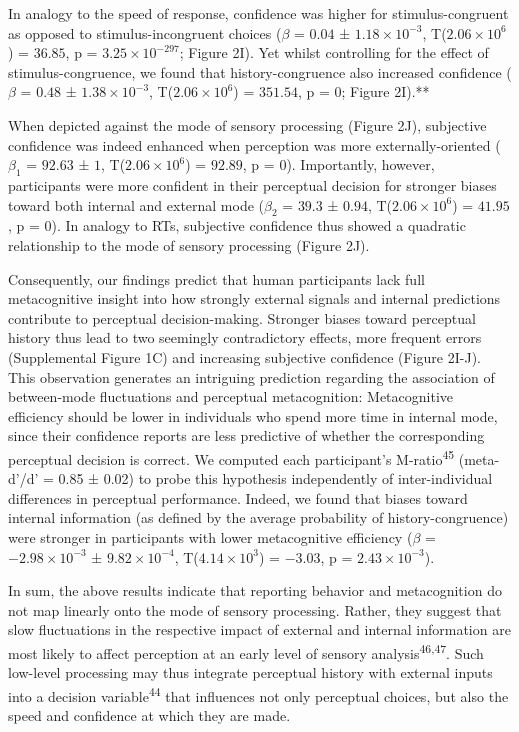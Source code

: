 \documentclass[
]{article}
\begin{document}
In analogy to the speed of response, confidence was higher for
stimulus-congruent as opposed to stimulus-incongruent choices (\(\beta\)
= \(0.04\) ± \(\ensuremath{1.18\times 10^{-3}}\),
T(\(\ensuremath{2.06\times 10^{6}}\)) = \(36.85\), p =
\(\ensuremath{3.25\times 10^{-297}}\); Figure 2I). Yet whilst
controlling for the effect of stimulus-congruence, we found that
history-congruence also increased confidence (\(\beta\) = \(0.48\) ±
\(\ensuremath{1.38\times 10^{-3}}\),
T(\(\ensuremath{2.06\times 10^{6}}\)) = \(351.54\), p = \(0\); Figure
2I).**

When depicted against the mode of sensory processing (Figure 2J),
subjective confidence was indeed enhanced when perception was more
externally-oriented (\(\beta_1\) = \(92.63\) ± \(1\),
T(\(\ensuremath{2.06\times 10^{6}}\)) = \(92.89\), p = \(0\)).
Importantly, however, participants were more confident in their
perceptual decision for stronger biases toward both internal and
external mode (\(\beta_2\) = \(39.3\) ± \(0.94\),
T(\(\ensuremath{2.06\times 10^{6}}\)) = \(41.95\), p = \(0\)). In
analogy to RTs, subjective confidence thus showed a quadratic
relationship to the mode of sensory processing (Figure 2J).

Consequently, our findings predict that human participants lack full
metacognitive insight into how strongly external signals and internal
predictions contribute to perceptual decision-making. Stronger biases
toward perceptual history thus lead to two seemingly contradictory
effects, more frequent errors (Supplemental Figure 1C) and increasing
subjective confidence (Figure 2I-J). This observation generates an
intriguing prediction regarding the association of between-mode
fluctuations and perceptual metacognition: Metacognitive efficiency
should be lower in individuals who spend more time in internal mode,
since their confidence reports are less predictive of whether the
corresponding perceptual decision is correct. We computed each
participant's M-ratio\textsuperscript{45} (meta-d'/d' = 0.85 ± 0.02) to
probe this hypothesis independently of inter-individual differences in
perceptual performance. Indeed, we found that biases toward internal
information (as defined by the average probability of
history-congruence) were stronger in participants with lower
metacognitive efficiency (\(\beta\) =
\(\ensuremath{-2.98\times 10^{-3}}\) ±
\(\ensuremath{9.82\times 10^{-4}}\),
T(\(\ensuremath{4.14\times 10^{3}}\)) = \(-3.03\), p =
\(\ensuremath{2.43\times 10^{-3}}\)).

In sum, the above results indicate that reporting behavior and
metacognition do not map linearly onto the mode of sensory processing.
Rather, they suggest that slow fluctuations in the respective impact of
external and internal information are most likely to affect perception
at an early level of sensory analysis\textsuperscript{46,47}. Such
low-level processing may thus integrate perceptual history with external
inputs into a decision variable\textsuperscript{44} that influences not
only perceptual choices, but also the speed and confidence at which they
are made.
\end{document}
